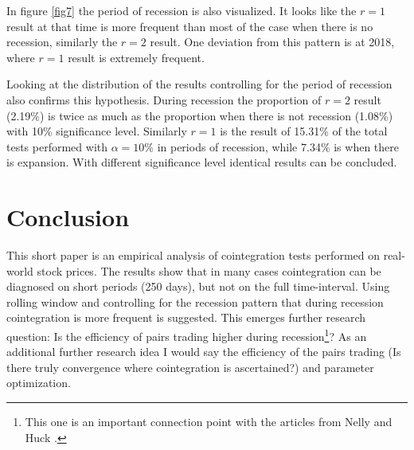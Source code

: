 \documentclass[12pt, a4paper, twoside, titlepage]{article}
\begin{document}
In figure \ref{fig7} the period of recession is also visualized. It looks like the $r = 1$ result at that time is more frequent than most of the case when there is no recession, similarly the $r = 2$ result. One deviation from this pattern is at 2018, where $r = 1$ result is extremely frequent.

Looking at the distribution of the results controlling for the period of recession also confirms this hypothesis. During recession the proportion of $r = 2$ result (2.19\%) is twice as much as the proportion when there is not recession (1.08\%) with 10\% significance level. Similarly $r = 1$ is the result of 15.31\% of the total tests performed with $\alpha = 10\%$ in periods of recession, while 7.34\% is when there is expansion. With different significance level identical results can be concluded.

\section{Conclusion}

This short paper is an empirical analysis of cointegration tests performed on real-world stock prices. The results show that in many cases cointegration can be diagnosed on short periods (250 days), but not on the full time-interval. Using rolling window and controlling for the recession pattern that during recession cointegration is more frequent is suggested. This emerges further research question: Is the efficiency of pairs trading higher during recession\footnote{This one is an important connection point with the articles from Nelly \cite{Neely.2014} and Huck \cite{Huck.2014}.}? As an additional further research idea I would say the efficiency of the pairs trading (Is there truly convergence where cointegration is ascertained?) and parameter optimization.


\begin{appendix}
  \listoffigures
\end{appendix}



\end{document}
